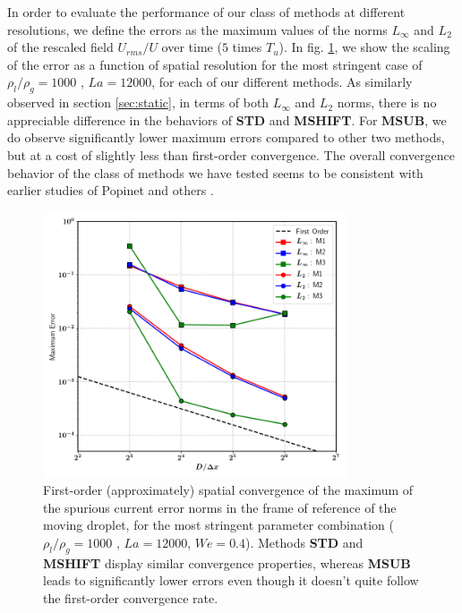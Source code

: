 In order to evaluate the performance of our class of methods at different resolutions, we define the errors as the maximum values of the norms $L_\infty$ and $L_2$ of the rescaled field $U_{rms}/U$ over time ($5$ times $T_u$). In fig. \ref{moving_drop_conv}, we show the scaling of the error as a function of spatial resolution for the most stringent case of $\rho_l/\rho_g = 1000 $ , $La = 12000$, for each of our different methods. As similarly observed in section \ref{sec:static}, in terms of both $L_\infty$ and $L_2$ norms, there is no appreciable difference in the behaviors of \textbf{STD} and \textbf{MSHIFT}. For \textbf{MSUB}, we do observe significantly lower maximum errors compared to other two methods, but at a cost of slightly less than first-order convergence. The overall convergence behavior of the class of methods we have tested seems to be consistent with earlier studies of Popinet \cite{popinet2009accurate} and others  .  

\begin{figure}[h!]
    \centering
    \includegraphics[width = 0.8\textwidth]{plots/droplet_advect/convergence_all.png}
	\caption{First-order (approximately) spatial convergence of the maximum of the spurious current error norms in the frame of reference of the moving droplet, for the most stringent parameter combination ($\rho_l/\rho_g = 1000 $ , $La = 12000$, $We = 0.4$). Methods \textbf{STD} and \textbf{MSHIFT} display similar convergence properties, whereas \textbf{MSUB} leads to significantly lower errors even though it doesn't quite follow the first-order convergence rate. }   
    \label{moving_drop_conv}
\end{figure}

